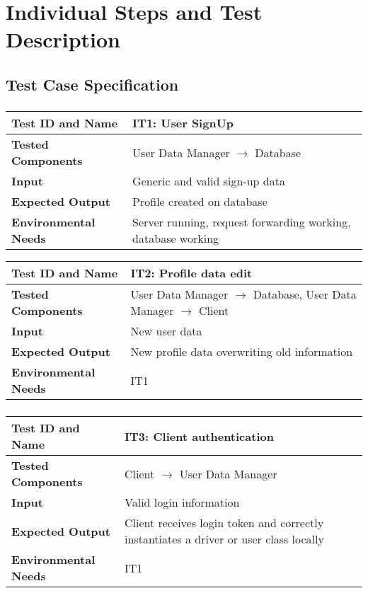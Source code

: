 \section{Individual Steps and Test Description}
\subsection{Test Case Specification}

\subsubsection{}

\begin{tabular}{l p{}}
    \hline
    \textbf{Test ID and Name} & \textbf{IT1: User SignUp}\\
    \hline
    \textbf{Tested Components} & User Data Manager $\rightarrow$ Database\\
    \hline
    \textbf{Input} & Generic and valid sign-up data\\
    \hline
    \textbf{Expected Output} & Profile created on database\\
    \hline
    \textbf{Environmental Needs} & Server running, request forwarding working, database working\\
    \hline
\end{tabular}

\vspace{2em}

\noindent\begin{tabular}{l p{}}
    \hline
    \textbf{Test ID and Name} & \textbf{IT2: Profile data edit}\\
    \hline
    \textbf{Tested Components} & User Data Manager $\rightarrow$ Database, User Data Manager $\rightarrow$ Client\\
    \hline
    \textbf{Input} & New user data\\
    \hline
    \textbf{Expected Output} & New profile data overwriting old information\\
    \hline
    \textbf{Environmental Needs} & IT1\\
    \hline
\end{tabular}

\subsubsection{}

\begin{tabular}{l p{}}
    \hline
    \textbf{Test ID and Name} & \textbf{IT3: Client authentication}\\
    \hline
    \textbf{Tested Components} & Client $\rightarrow$ User Data Manager\\
    \hline
    \textbf{Input} & Valid login information\\
    \hline
    \textbf{Expected Output} & Client receives login token and correctly instantiates a driver or user class locally\\
    \hline
    \textbf{Environmental Needs} & IT1\\
    \hline
\end{tabular}

